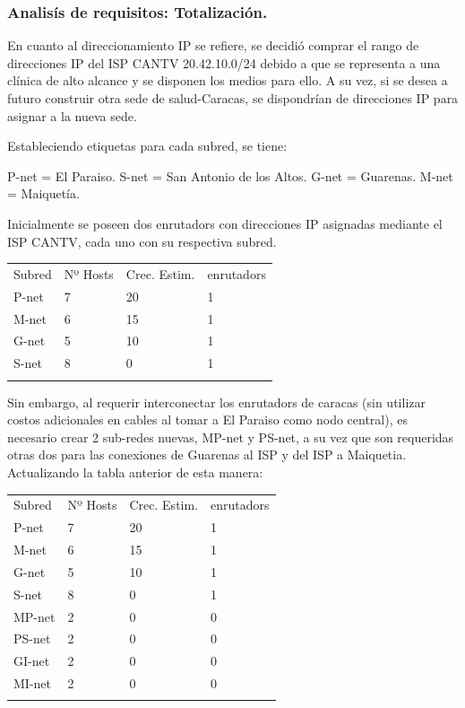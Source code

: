 \subsubsection{Analisís de requisitos:
Totalización.}\label{analisuxeds-de-requisitos-totalizaciuxf3n.}

En cuanto al direccionamiento IP se refiere, se decidió comprar el rango
de direcciones IP del ISP CANTV 20.42.10.0/24 debido a que se representa
a una clínica de alto alcance y se disponen los medios para ello. A su
vez, si se desea a futuro construir otra sede de salud-Caracas, se
dispondrían de direcciones IP para asignar a la nueva sede.

Estableciendo etiquetas para cada subred, se tiene:

P-net = El Paraiso. S-net = San Antonio de los Altos. G-net = Guarenas.
M-net = Maiquetía.

Inicialmente se poseen dos enrutadors con direcciones IP asignadas
mediante el ISP CANTV, cada uno con su respectiva subred.

\begin{longtable}[c]{@{}llll@{}}
\toprule\addlinespace
Subred & Nº Hosts & Crec. Estim. & enrutadors
\\\addlinespace
\midrule\endhead
P-net & 7 & 20 & 1
\\\addlinespace
M-net & 6 & 15 & 1
\\\addlinespace
G-net & 5 & 10 & 1
\\\addlinespace
S-net & 8 & 0 & 1
\\\addlinespace
\bottomrule
\end{longtable}

Sin embargo, al requerir interconectar los enrutadors de caracas (sin
utilizar costos adicionales en cables al tomar a El Paraiso como nodo
central), es necesario crear 2 sub-redes nuevas, MP-net y PS-net, a su
vez que son requeridas otras dos para las conexiones de Guarenas al ISP
y del ISP a Maiquetia. Actualizando la tabla anterior de esta manera:

\begin{longtable}[c]{@{}llll@{}}
\toprule\addlinespace
Subred & Nº Hosts & Crec. Estim. & enrutadors
\\\addlinespace
\midrule\endhead
P-net & 7 & 20 & 1
\\\addlinespace
M-net & 6 & 15 & 1
\\\addlinespace
G-net & 5 & 10 & 1
\\\addlinespace
S-net & 8 & 0 & 1
\\\addlinespace
MP-net & 2 & 0 & 0
\\\addlinespace
PS-net & 2 & 0 & 0
\\\addlinespace
GI-net & 2 & 0 & 0
\\\addlinespace
MI-net & 2 & 0 & 0
\\\addlinespace
\bottomrule
\end{longtable}

